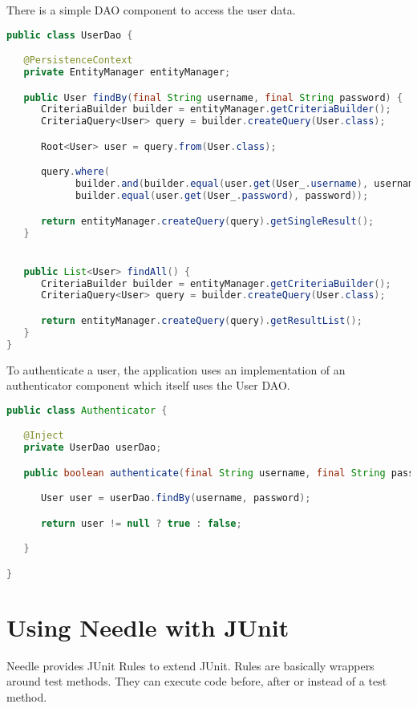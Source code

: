 \parskip 14pt
\parindent 0pt
There is a simple DAO component to access the user data.

\begin{lstlisting}[language={JAVA},caption=The User DAO component]
public class UserDao {

   @PersistenceContext
   private EntityManager entityManager;

   public User findBy(final String username, final String password) {
      CriteriaBuilder builder = entityManager.getCriteriaBuilder();
      CriteriaQuery<User> query = builder.createQuery(User.class);

      Root<User> user = query.from(User.class);

      query.where(
            builder.and(builder.equal(user.get(User_.username), username)),
            builder.equal(user.get(User_.password), password));

      return entityManager.createQuery(query).getSingleResult();
   }


   public List<User> findAll() {
      CriteriaBuilder builder = entityManager.getCriteriaBuilder();
      CriteriaQuery<User> query = builder.createQuery(User.class);

      return entityManager.createQuery(query).getResultList();
   }
}
\end{lstlisting}

\parskip 14pt
\parindent 0pt
To authenticate a user, the application uses an implementation of an authenticator component which itself uses the User DAO.

\begin{lstlisting}[language={JAVA},caption=The authenticator component]
public class Authenticator {

   @Inject
   private UserDao userDao;

   public boolean authenticate(final String username, final String password) {

      User user = userDao.findBy(username, password);

      return user != null ? true : false;

   }

}
\end{lstlisting}

\section{Using Needle with JUnit}
\label{sec: JUnit}

Needle provides JUnit Rules to extend JUnit. Rules are basically wrappers around test methods.
They can execute code before, after or instead of a test method.

